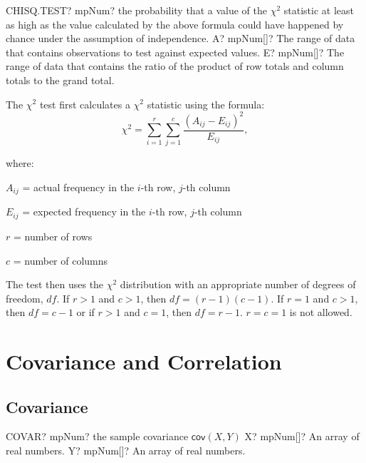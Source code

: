 \vspace{0.6cm}
\begin{mpFunctionsExtract}
	\mpWorksheetFunctionTwoNotImplemented
	{CHISQ.TEST? mpNum? the probability that a value of the $\chi^2$ statistic at least as high as the value calculated by the above formula could have happened by chance under the assumption of independence.}
	{A? mpNum[]? The range of data that contains observations to test against expected values.}
	{E? mpNum[]? The range of data that contains the ratio of the product of row totals and column totals to the grand total.}
\end{mpFunctionsExtract}

The $\chi^2$ test first calculates a $\chi^2$ statistic using the formula: 
\begin{equation}
	\chi^2 = \sum_{i=1}^r \sum_{j=1}^c \frac{(A_{ij} - E_{ij})^2}{E_{ij}},
\end{equation}

where:

$A_{ij}$ = actual frequency in the $i$-th row, $j$-th column

$E_{ij}$ = expected frequency in the $i$-th row, $j$-th column

$r$ = number of rows

$c$ = number of columns

\vspace{0.3cm}
The test then uses the $\chi^2$ distribution with an appropriate number of degrees of freedom, $df$. If $r > 1$ and $c > 1$, then $df = (r - 1)(c - 1)$. If $r = 1$ and $c > 1$, then $df = c - 1$ or if $r > 1$ and $c = 1$, then $df = r - 1$. $r = c= 1$ is not allowed.





\newpage
\section{Covariance and Correlation}

\subsection{Covariance}
\label{Covariance}

\begin{mpFunctionsExtract}
	\mpWorksheetFunctionTwoNotImplemented
	{COVAR? mpNum? the sample covariance $\textsf{cov}(X,Y)$}
	{X? mpNum[]? An array of real numbers.}
	{Y? mpNum[]? An array of real numbers.}
\end{mpFunctionsExtract}

